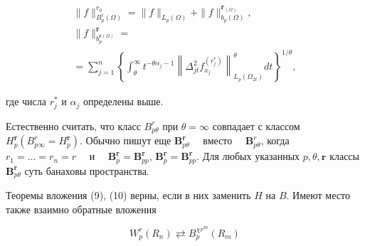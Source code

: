 \documentclass[10pt]{article}
\begin{document}
\[

\begin{gathered}

\|f\|_{B_{p}^{r}(\Omega)}^{r_{0}}=\|f\|_{L_{p}(\Omega)}+\|f\|_{b_{p}(\Omega)}^{\boldsymbol{r}_{(\Omega)}}, \\

\|f\|_{b_{p}^{\boldsymbol{r}(\Omega)}}^{\boldsymbol{r}}= \\

=\sum_{j=1}^{n}\left\{\int_{\theta}^{\infty} t^{-\theta \alpha_{j}-1}\left\|\Delta_{j t}^{2} f_{x_{j}}^{\left(r_{j}^{*}\right)}\right\|_{L_{p}\left(\Omega_{2 t}\right)}^{\theta} d t\right\}^{1 / \theta},

\end{gathered}

\]



где числа $r_{j}^{*}$ и $\alpha_{j}$ определены выше.



Естественно считать, что класс $B_{p \theta}^{r}$ при $\theta=\infty$ совпадает с классом $H_{p}^{\boldsymbol{r}}\left(B_{p \infty}^{r}=H_{p}^{\boldsymbol{r}}\right)$. Обычно пишут еще $\boldsymbol{B}_{p \theta}^{\boldsymbol{r}} \quad$ вместо $\quad \boldsymbol{B}_{p \theta}^{r}$, когда $r_{1}=\ldots=r_{n}=r \quad$ и $\quad \boldsymbol{B}_{p}^{\boldsymbol{r}}=\boldsymbol{B}_{p p}^{\boldsymbol{r}}$, $\boldsymbol{B}_{p}^{\boldsymbol{r}}=\boldsymbol{B}_{p p}^{\boldsymbol{r}}$. Для любых указанных $p, \theta, \boldsymbol{r}$ классы $\boldsymbol{B}_{p \theta}^{\boldsymbol{r}}$ суть банаховы пространства.



Теоремы вложения (9), (10) верны, если в них заменить $H$ на $B$. Имеют место также взаимно обратные вложения



\[

W_{p}^{r}\left(R_{n}\right) \rightleftarrows B_{p}^{\chi r^{m}}\left(R_{m}\right)

\]
\end{document}
